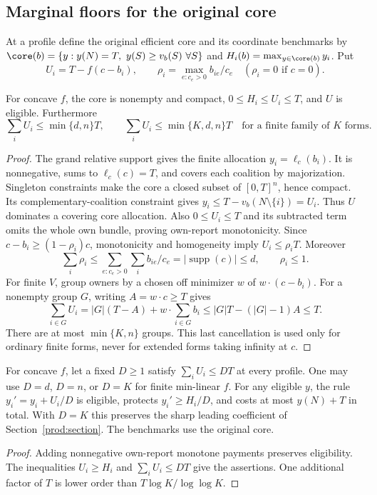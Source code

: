 \subsection{Marginal floors for the original core}
At a profile define the original efficient core and its coordinate benchmarks
by $\core(b)=\{y:y(N)=T,\ y(S)\ge v_b(S)\ \forall S\}$ and
$H_i(b)=\max_{y\in\core(b)}y_i$.  Put
\begin{equation}\label{ext:eq:marginal}
 U_i=T-f(c-b_i),\qquad
 \rho_i=\max_{e:c_e>0}b_{ie}/c_e\quad(\rho_i=0\text{ if }c=0).
\end{equation}

\begin{lemma}\label{ext:lem:marginal}
For concave $f$, the core is nonempty and compact,
$0\le H_i\le U_i\le T$, and $U$ is eligible.  Furthermore
\[
 \sum_iU_i\le\min\{d,n\}T,\qquad
 \sum_iU_i\le\min\{K,d,n\}T\quad\text{for a finite family of $K$ forms}.
\]
\end{lemma}
\begin{proof}
The grand relative support gives the finite allocation $y_i=\ell_c(b_i)$.
It is nonnegative, sums to $\ell_c(c)=T$, and covers each coalition by
majorization.  Singleton constraints make the core a closed subset of
$[0,T]^n$, hence compact.  Its complementary-coalition constraint gives
$y_i\le T-v_b(N\setminus\{i\})=U_i$.  Thus $U$ dominates a covering core
allocation.  Also $0\le U_i\le T$ and its subtracted term omits the whole
own bundle, proving own-report monotonicity.
Since $c-b_i\ge(1-\rho_i)c$, monotonicity and homogeneity imply
$U_i\le\rho_iT$.  Moreover
\[
 \sum_i\rho_i\le\sum_{e:c_e>0}\sum_i b_{ie}/c_e
   =|\operatorname{supp}(c)|\le d,\qquad \rho_i\le1.
\]
For finite $V$, group owners by a chosen off minimizer $w$ of $w\cdot(c-b_i)$.
For a nonempty group $G$, writing $A=w\cdot c\ge T$ gives
\[
 \sum_{i\in G}U_i=|G|(T-A)+w\cdot\sum_{i\in G}b_i
 \le|G|T-(|G|-1)A\le T.
\]
There are at most $\min\{K,n\}$ groups.  This last cancellation is used only
for ordinary finite forms, never for extended forms taking infinity at $c$.
\end{proof}

\begin{proposition}\label{ext:prop:floor}
For concave $f$, let a fixed $D\ge1$ satisfy $\sum_iU_i\le DT$ at every
profile.  One may use $D=d$, $D=n$, or $D=K$ for finite min-linear $f$.
For any eligible $y$, the rule $y_i'=y_i+U_i/D$ is eligible, protects
$y_i'\ge H_i/D$, and costs at most $y(N)+T$ in total.
With $D=K$ this preserves the sharp leading coefficient of
Section~\ref{prod:section}.  The benchmarks use the original core.
\end{proposition}
\begin{proof}
Adding nonnegative own-report monotone payments preserves eligibility.
The inequalities $U_i\ge H_i$ and $\sum_iU_i\le DT$ give the assertions.
One additional factor of $T$ is lower order than $T\log K/\log\log K$.
\end{proof}


